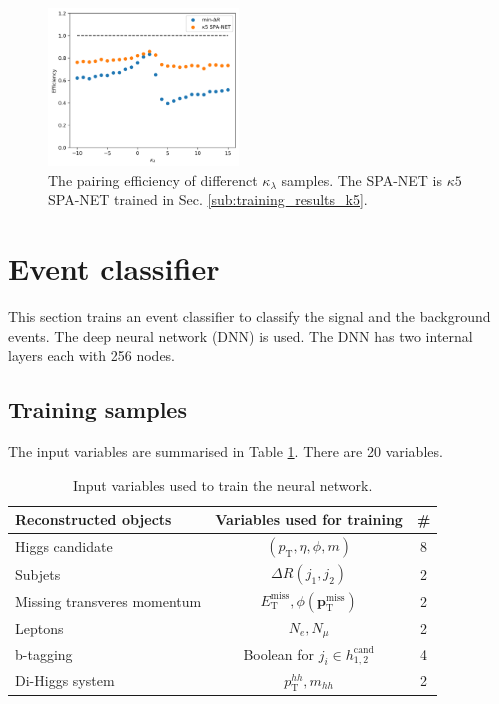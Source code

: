 \documentclass[12pt]{article}
\renewcommand{\vec}[1]{\boldsymbol{\mathbf{#1}}}
\begin{document}
	\begin{figure}[htpb]
		\centering
		\includegraphics[width=0.45\textwidth]{pairing_efficiency_kappa-k5.png}
		\caption{The pairing efficiency of differenct $\kappa_\lambda $ samples. The SPA-NET is $\kappa 5 $ SPA-NET trained in Sec. \ref{sub:training_results_k5}.}
		\label{fig:pairing_efficiency_kappa-k5}
	\end{figure}
\section{Event classifier}%
\label{sec:event_classifier}
	This section trains an event classifier to classify the signal and the background events. The deep neural network (DNN) is used.  The DNN has two internal layers each with 256 nodes.

	\subsection{Training samples}%
	\label{sub:training_samples}
		The input variables are summarised in Table \ref{tab:DNN_variables}. There are 20 variables.
		\begin{table}[htpb]
			\centering
			\caption{Input variables used to train the neural network.}
			\label{tab:DNN_variables}
			\begin{tabular}{l|c|c}
				Reconstructed objects       & Variables used for training   & \# \\ \hline
				Higgs candidate             & $(p_\text{T}, \eta, \phi, m)$ & 8  \\
				Subjets                     & $\Delta R(j_1,j_2)$                    & 2  \\
				Missing transveres momentum & $E_{\text{T}}^{\text{miss}}, \phi(\vec{p}_{\text{T}}^{\text{miss}})$  & 2  \\
				Leptons                     & $N_e, N_\mu $                  & 2  \\
				b-tagging                   & Boolean for $j_i \in h_{1,2}^{\text{cand}}$       & 4  \\
				Di-Higgs system             & $p_\text{T}^{hh}, m_{hh}$        & 2 
			\end{tabular}		
		\end{table}
\end{document}
